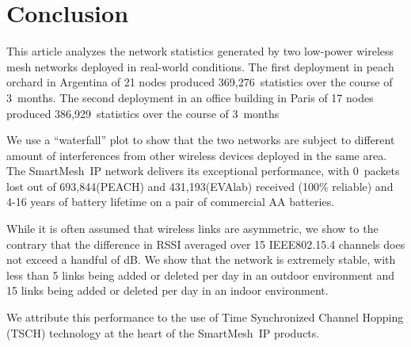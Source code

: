 \documentclass{elsarticle}
\newcommand{\smip}                {SmartMesh~IP\xspace}
\newcommand{\PEACHNUMSTATS}       {369,276\xspace}
\newcommand{\PEACHNUMPCKTS}       {693,844\xspace}
\newcommand{\EVANUMSTATS}         {386,929\xspace}
\newcommand{\EVANUMPCKTS}         {431,193\xspace}
\begin{document}
\section{Conclusion}
\label{sec:conclusion}


This article analyzes the network statistics generated by two low-power wireless mesh networks deployed in real-world conditions.
The first deployment in peach orchard in Argentina of 21 nodes produced \PEACHNUMSTATS~statistics over the course of 3~months.
The second deployment in an office building in Paris of 17 nodes produced \EVANUMSTATS~statistics over the course of 3~months


We use a ``waterfall'' plot to show that the two networks are subject to different amount of interferences from other wireless devices deployed in the same area.
The \smip network delivers its exceptional performance, with 0~packets lost out of \PEACHNUMPCKTS (PEACH) and \EVANUMPCKTS (EVAlab) received (100\% reliable) and 4-16 years of battery lifetime on a pair of commercial AA batteries.


While it is often assumed that wireless links are asymmetric, we show to the contrary that the difference in RSSI averaged over 15 IEEE802.15.4 channels does not exceed a handful of dB.
We show that the network is extremely stable, with less than 5 links being added or deleted per day in an outdoor environment and 15 links  being added or deleted per day in an indoor environment.


We attribute this performance to the use of Time Synchronized Channel Hopping (TSCH) technology at the heart of the \smip products.

\newpage
%
%
\end{document}
